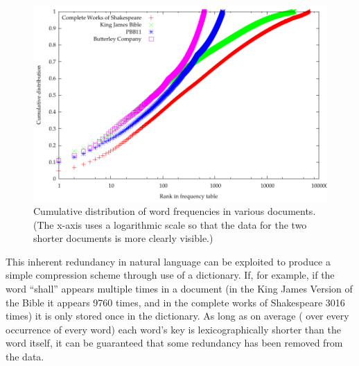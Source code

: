 \begin{figure}
  \begin{center}
  \includegraphics[width=\textwidth]{gnuplot/cumulative}
  \end{center}
  \caption[Cumulative distribution of word frequencies]{Cumulative distribution of word frequencies in various documents. (The x-axis uses a logarithmic scale so that the data for the two shorter documents is more clearly visible.)}
  \label{fig:cumulative}
\end{figure}

This inherent redundancy in natural language can be exploited to produce a simple compression scheme through use of a dictionary. If, for example, if the word ``shall'' appears multiple times in a document (in the King James Version of the Bible it appears 9760 times, and in the complete works of Shakespeare 3016 times) it is only stored once in the dictionary. As long as on average (\ie{} over every occurrence of every word) each word's key is lexicographically shorter than the word itself, it can be guaranteed that some redundancy has been removed from the data.

